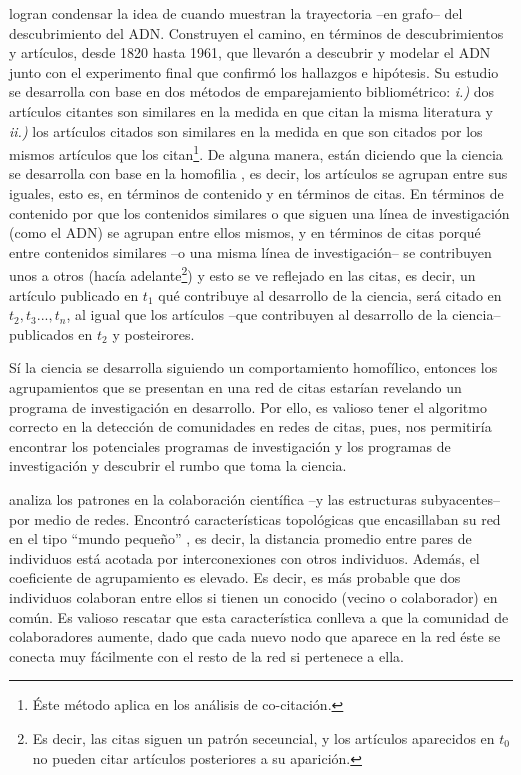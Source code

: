 \documentclass[12pt,letter]{article}
\begin{document}
\vspace{0.5cm}
\cite{Hummon} logran condensar la idea de \cite{Cronin1, Cronin2} cuando muestran la trayectoria --en grafo-- del descubrimiento del ADN. Construyen el camino, en términos de descubrimientos y artículos, desde 1820 hasta 1961, que llevarón a descubrir y modelar el ADN junto con el experimento final que confirmó los hallazgos e hipótesis. Su estudio se desarrolla con base en dos métodos de emparejamiento bibliométrico: \emph{i.)} dos artículos citantes son similares en la medida en que citan la misma literatura y \emph{ii.)} los artículos citados son similares en la medida en que son citados por los mismos artículos que los citan\footnote{Éste método aplica en los análisis de co-citación.}. De alguna manera, \cite{Hummon} están diciendo que la ciencia se desarrolla con base en la homofilia \citep{Kossinets}, es decir, los artículos se agrupan entre sus iguales, esto es, en términos de contenido y en términos de citas. En términos de contenido por que los contenidos similares o que siguen una línea de investigación (como el ADN) se agrupan entre ellos mismos, y en términos de citas porqué entre contenidos similares --o una misma línea de investigación-- se contribuyen unos a otros (hacía adelante\footnote{Es decir, las citas siguen un patrón seceuncial, y los artículos aparecidos en $t_0$ no pueden citar artículos posteriores a su aparición.}) y esto se ve reflejado en las citas, es decir, un artículo publicado en $t_1$ qué contribuye al desarrollo de la ciencia, será citado en $t_2, t_3..., t_n$, al igual que los artículos --que contribuyen al desarrollo de la ciencia-- publicados en $t_2$ y posteirores.

\vspace{0.5cm}
Sí la ciencia se desarrolla siguiendo un comportamiento homofílico, entonces los agrupamientos que se presentan en una red de citas estarían revelando un programa de investigación en desarrollo. Por ello, es valioso tener el algoritmo correcto en la detección de comunidades en redes de citas, pues, nos permitiría encontrar los potenciales programas de investigación y los programas de investigación y descubrir el rumbo que toma la ciencia.

\vspace{0.5cm}

\cite{Newman1} analiza los patrones en la colaboración científica --y las estructuras subyacentes-- por medio de redes. Encontró características topológicas que encasillaban su red en el tipo ``mundo pequeño'' \citep{Watts}, es decir, la distancia promedio entre pares de individuos está acotada por interconexiones con otros individuos. Además, el coeficiente de agrupamiento es elevado. Es decir, es más probable que dos individuos colaboran entre ellos si tienen un conocido (vecino o colaborador) en común. Es valioso rescatar que esta característica conlleva a que la comunidad de colaboradores aumente, dado que cada nuevo nodo que aparece en la red éste se conecta muy fácilmente con el resto de la red si pertenece a ella.
\end{document}
